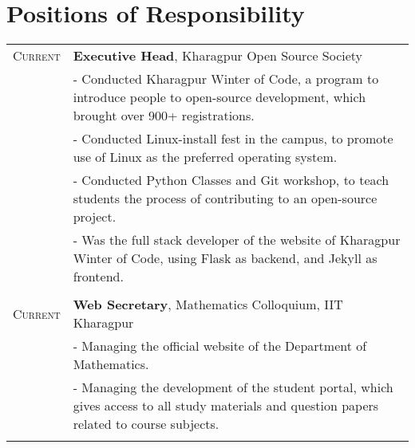 \documentclass[a4paper,10pt]{extarticle} %
\begin{document}
\begin{tabular}{r|p{18cm}}

\end{tabular}



\section{Positions of Responsibility}

\begin{tabular}{r|p{18cm}}
\textsc{Current} & \textbf{Executive Head}, Kharagpur Open Source Society
\vspace{1mm} \\
& \footnotesize{- Conducted Kharagpur Winter of Code, a program to introduce people to open-source development, which brought over 900+ registrations.}\\
& \footnotesize{- Conducted Linux-install fest in the campus, to promote use of Linux as the preferred operating system.}\\
& \footnotesize{- Conducted Python Classes and Git workshop, to teach students the process of contributing to an open-source project.}\\
& \footnotesize{- Was the full stack developer of the website of Kharagpur Winter of Code, using Flask as backend, and Jekyll as frontend.}\\
\\
\textsc{Current} & \textbf{Web Secretary}, Mathematics Colloquium, IIT Kharagpur
\vspace{1mm} \\
& \footnotesize{- Managing the official website of the Department of Mathematics.}\\
& \footnotesize{- Managing the development of the student portal, which gives access to all study materials and question papers related to course subjects.}\\
\\
\end{tabular}
\end{document}
